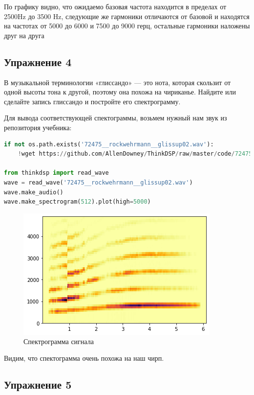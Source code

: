 По графику видно, что ожидаемо базовая частота находится в пределах от 2500Hz до 3500 Hz, следующие же гармоники отличаются от базовой и находятся на частотах от 5000 до 6000 и 7500 до 9000 герц, остальные гармоники наложены друг на друга

\subsection{Упражнение 4}

В музыкальной терминологии «глиссандо» — это нота, которая скользит от одной высоты тона к другой, поэтому она похожа на чириканье. Найдите или сделайте запись глиссандо и постройте его спектрограмму.

Для вывода соответствующей спектограммы, возьмем нужный нам звук из репозитория учебника:

\begin{lstlisting}[language=Python]
if not os.path.exists('72475__rockwehrmann__glissup02.wav'):
    !wget https://github.com/AllenDowney/ThinkDSP/raw/master/code/72475__rockwehrmann__glissup02.wav
    
from thinkdsp import read_wave
wave = read_wave('72475__rockwehrmann__glissup02.wav')
wave.make_audio()
wave.make_spectrogram(512).plot(high=5000)
\end{lstlisting}
\begin{figure}[H]
	\begin{center}
		\includegraphics[scale=1]{fig/lab03/lab03_6.png}
		\caption{Спектрограмма сигнала}
	\end{center}
\end{figure}

Видим, что спектограмма очень похожа на наш чирп.

\subsection{Упражнение 5}

